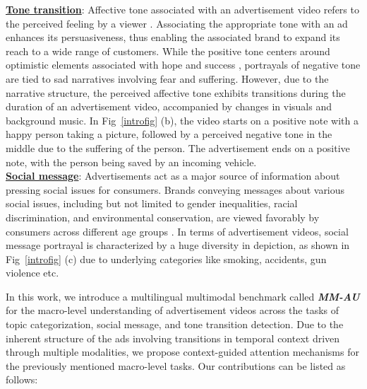 \textbf{\underline{Tone transition}}: Affective tone associated with an advertisement video refers to the perceived feeling by a viewer \cite{Veer2008HowTT}. Associating the appropriate tone with an ad enhances its persuasiveness, thus enabling the associated brand to expand its reach to a wide range of customers. While the positive tone centers around optimistic elements associated with hope and success \cite{Brooks2020ExploringAO}, portrayals of negative tone are tied to sad narratives involving fear and suffering. However, due to the narrative structure, the perceived affective tone exhibits transitions during the duration of an advertisement video, accompanied by changes in visuals and background music.  In Fig~\ref{introfig} (b), the video starts on a positive note with a happy person taking a picture, followed by a perceived negative tone in the middle due to the suffering of the person. The advertisement ends on a positive note, with the person being saved by an incoming vehicle.\\

\textbf{\underline{Social message}}: Advertisements act as a major source of information about pressing social issues for consumers. Brands conveying messages about various social issues, including but not limited to gender inequalities, racial discrimination, and environmental conservation, are viewed favorably by consumers across different age groups \cite{Brooks2020ExploringAO}. In terms of advertisement videos, social message portrayal is characterized by a huge diversity in depiction, as shown in Fig~\ref{introfig} (c) due to underlying categories like smoking, accidents, gun violence etc.

In this work, we introduce a multilingual multimodal benchmark called \textbf{\textit{MM-AU}} for the macro-level understanding of advertisement videos across the tasks of topic categorization, social message, and tone transition detection. Due to the inherent structure of the ads involving transitions in temporal context driven through multiple modalities, we propose context-guided attention mechanisms for the previously mentioned macro-level tasks. Our contributions can be listed as follows:

